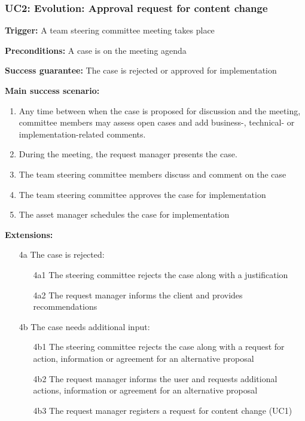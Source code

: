 	
	\subsubsection{UC2: Evolution: Approval request for content change}
	\label{sec:uc2}
	
	\textbf{Trigger:} A team steering committee meeting takes place 
	
	\textbf{Preconditions:} A case is on the meeting agenda 
	
	\textbf{Success guarantee:} The case is rejected or approved for implementation
	
	\textbf{Main success scenario:}
	
	\begin{enumerate}
		\item Any time between when the case is proposed for discussion and the meeting, committee members may assess open cases and add business-, technical- or implementation-related comments. 
		\item During the meeting, the request manager presents the case.
		\item The team steering committee members discuss and comment on the case
		\item The team steering committee approves the case for implementation
		\item The asset manager schedules the case for implementation		
	\end{enumerate}
	\textbf{Extensions:}
	\begin{enumerate}
		\item [4a] The case is rejected:
		\begin{enumerate}
			\item [4a1] The steering committee rejects the case along with a justification
			\item [4a2] The request manager informs the client and provides recommendations			
		\end{enumerate}
		\item [4b] The case needs additional input:
		\begin{enumerate}
			\item [4b1]  The steering committee rejects the case along with a request for action, information or agreement for an alternative proposal
			\item [4b2] The request manager informs the user and requests additional actions, information or agreement for an alternative proposal
			\item [4b3] The request manager registers a request for content change (UC1)
		\end{enumerate}
	\end{enumerate}

